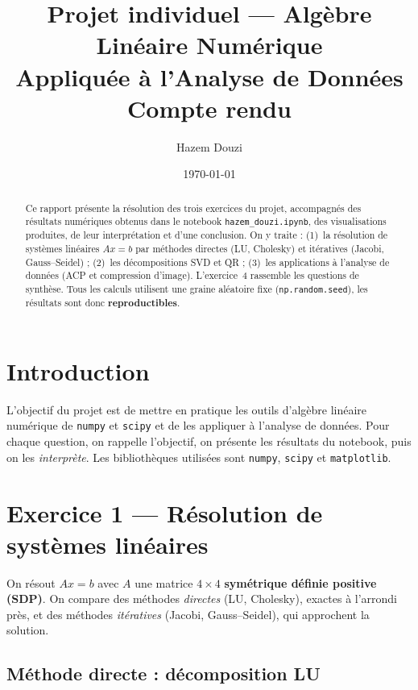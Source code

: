 \documentclass[11pt,a4paper]{article}
\title{\textbf{Projet individuel --- Algèbre Linéaire Numérique\\
Appliquée à l'Analyse de Données}\\[4pt]
\large Compte rendu}
\author{Hazem Douzi}
\date{\today}
\begin{document}
\maketitle

\begin{abstract}
\noindent Ce rapport présente la résolution des trois exercices du projet, accompagnés des
résultats numériques obtenus dans le notebook \texttt{hazem\_douzi.ipynb}, des visualisations
produites, de leur interprétation et d'une conclusion. On y traite : (1)~la résolution de
systèmes linéaires $Ax=b$ par méthodes directes (LU, Cholesky) et itératives (Jacobi,
Gauss--Seidel) ; (2)~les décompositions SVD et QR ; (3)~les applications à l'analyse de
données (ACP et compression d'image). L'exercice~4 rassemble les questions de synthèse.
Tous les calculs utilisent une graine aléatoire fixe (\verb|np.random.seed|), les résultats
sont donc \textbf{reproductibles}.
\end{abstract}

{\small\tableofcontents}
\bigskip

\section{Introduction}
L'objectif du projet est de mettre en pratique les outils d'algèbre linéaire numérique de
\texttt{numpy} et \texttt{scipy} et de les appliquer à l'analyse de données. Pour chaque
question, on rappelle l'objectif, on présente les résultats du notebook, puis on les
\emph{interprète}. Les bibliothèques utilisées sont \texttt{numpy}, \texttt{scipy} et
\texttt{matplotlib}.

\section{Exercice 1 --- Résolution de systèmes linéaires}

On résout $Ax=b$ avec $A$ une matrice $4\times4$ \textbf{symétrique définie positive (SDP)}.
On compare des méthodes \emph{directes} (LU, Cholesky), exactes à l'arrondi près, et des
méthodes \emph{itératives} (Jacobi, Gauss--Seidel), qui approchent la solution.

\subsection{Méthode directe : décomposition LU}
\end{document}
